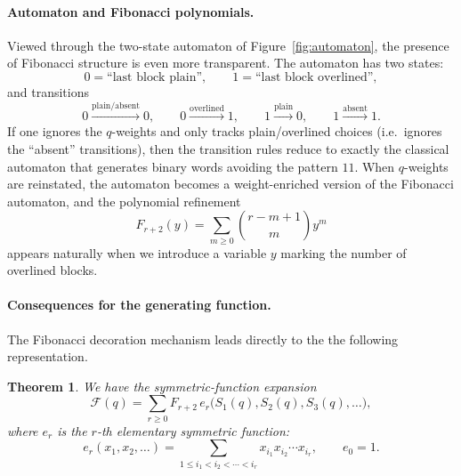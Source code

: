 \documentclass[letterpaper,12pt]{article}
\newtheorem{theorem}{Theorem}
\begin{document}
\paragraph{Automaton and Fibonacci polynomials.}
Viewed through the two-state automaton of Figure~\ref{fig:automaton}, the
presence of Fibonacci structure is even more transparent. The automaton has two
states:
\[
0 = \text{``last block plain''},\qquad
1 = \text{``last block overlined''},
\]
and transitions
\[
0 \xrightarrow{\text{plain/absent}} 0,\qquad
0 \xrightarrow{\text{overlined}} 1,\qquad
1 \xrightarrow{\text{plain}} 0,\qquad
1 \xrightarrow{\text{absent}} 1.
\]
If one ignores the \(q\)-weights and only tracks plain/overlined choices
(i.e.\ ignores the ``absent'' transitions), then the transition rules reduce
to exactly the classical automaton that generates binary words avoiding the
pattern \(11\). When \(q\)-weights are reinstated, the automaton becomes a
weight-enriched version of the Fibonacci automaton, and the polynomial
refinement
\begin{equation}
    F_{r+2}(y) = \sum_{m\ge0} \binom{r-m+1}{m} y^m
\end{equation}
appears naturally when we introduce a variable \(y\) marking the number of
overlined blocks.



\paragraph{Consequences for the  generating function.}
The Fibonacci decoration mechanism leads directly to the the following representation.
\begin{theorem}\label{thm:symm-expansion}
We have the symmetric-function expansion
\begin{equation}\label{eq:symm-expansion}
\mathcal{F}(q)=\sum_{r\ge 0} F_{r+2}\, e_r\!\bigl(S_1(q),S_2(q),S_3(q),\dots\bigr),
\end{equation}
where 
$e_r$ is the $r$-th elementary symmetric function:
\[
e_r(x_1,x_2,\dots)=\sum_{1\le i_1<i_2<\cdots<i_r} x_{i_1}x_{i_2}\cdots x_{i_r},
\qquad e_0=1.
\]
\end{theorem}
\end{document}
